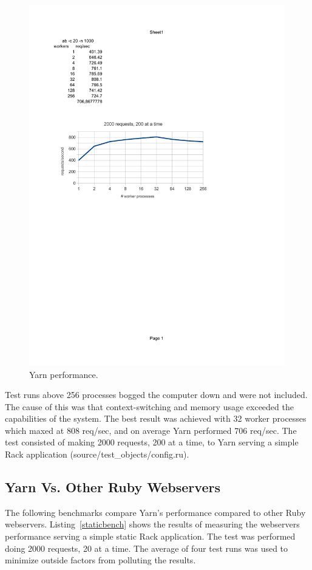 \begin{figure}[htb]
  \centering
  \includegraphics[width=0.99\textwidth]{benchmark/optimal_workers_crop.pdf}
  \caption{Yarn performance.}
  \label{optwork}
\end{figure}

Test runs above 256 processes bogged the computer down and were not included.
The cause of this was that context-switching and memory usage exceeded the
capabilities of the system. The best result was achieved with 32 worker
processes which maxed at 808 req/sec, and on average Yarn performed 706 req/sec. The
test consisted of making 2000 requests, 200 at a time, to Yarn serving a
simple Rack application (source/test\_objects/config.ru).

\subsection{Yarn Vs. Other Ruby Webservers}
The following benchmarks compare Yarn's performance compared to
other Ruby webservers. Listing~\ref{staticbench} shows the results of
measuring the webservers performance serving a simple static Rack application.
The test was performed doing 2000 requests, 20 at a time. The average of four
test runs was used to minimize outside factors from polluting the results.

